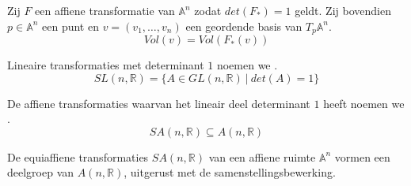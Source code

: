 \documentclass[main.tex]{subfiles}
\begin{document}
\begin{gev}
  Zij $F$ een affiene transformatie van $\mathbb{A}^{n}$ zodat $det(F_{*}) = 1$ geldt.
  Zij bovendien $p\in\mathbb{A}^{n}$ een punt en $v= (v_{1},\dotsc,v_{n})$ een geordende basis van $T_{p}\mathbb{A}^{n}$.
  \[ Vol(v) = Vol(F_{*}(v)) \]
\end{gev}

\begin{de}
  Lineaire transformaties met determinant $1$ noemen we .
  \[ SL(n,\mathbb{R}) = \{ A \in GL(n,\mathbb{R}) \ |\ det(A) = 1 \} \]
\end{de}

\begin{de}
  De affiene transformaties waarvan het lineair deel determinant $1$ heeft noemen we .
  \[ SA(n,\mathbb{R}) \subseteq A(n,\mathbb{R}) \]
\end{de}

\begin{st}
  De equiaffiene transformaties $SA(n,\mathbb{R})$ van een affiene ruimte $\mathbb{A}^{n}$ vormen een deelgroep van $A(n,\mathbb{R})$, uitgerust met de samenstellingsbewerking.
\end{st}
\end{document}
